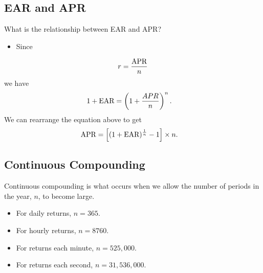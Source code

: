 \documentclass[letterpaper,10pt,english]{sphinxmanual}
\begin{document}
\subsection{EAR and APR}
\label{returns:ear-and-apr}
What is the relationship between EAR and APR?
\begin{itemize}
\item {} 
Since

\end{itemize}
\begin{gather}
\begin{split}r = \frac{\text{APR}}{n}\end{split}\notag
\end{gather}
we have
\begin{gather}
\begin{split}1 +\text{EAR} & = \left(1 + \frac{APR}{n}\right)^n.\end{split}\notag
\end{gather}
We can rearrange the equation above to get
\begin{gather}
\begin{split}\text{APR} & = \left[(1+\text{EAR})^{\frac{1}{n}} - 1\right]
\times n.\end{split}\notag
\end{gather}

\subsection{Continuous Compounding}
\label{returns:continuous-compounding}
Continuous compounding is what occurs when we allow the number of
periods in the year, $n$, to become large.
\begin{itemize}
\item {} 
For daily returns, $n=365$.

\end{itemize}
\begin{itemize}
\item {} 
For hourly returns, $n=8760$.

\end{itemize}
\begin{itemize}
\item {} 
For returns each minute, $n=525,000$.

\end{itemize}
\begin{itemize}
\item {} 
For returns each second, $n=31,536,000$.

\end{itemize}
\end{document}
